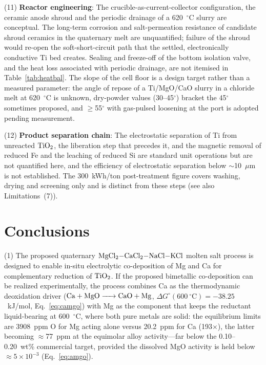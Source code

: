 \documentclass[pdflatex,sn-basic,Numbered]{sn-jnl}
\begin{document}
(11) \textbf{Reactor engineering}: The crucible-as-current-collector configuration, the ceramic anode shroud and the periodic drainage of a 620~$^{\circ}$C slurry are conceptual. The long-term corrosion and salt-permeation resistance of candidate shroud ceramics in the quaternary melt are unquantified; failure of the shroud would re-open the soft-short-circuit path that the settled, electronically conductive Ti bed creates. Sealing and freeze-off of the bottom isolation valve, and the heat loss associated with periodic drainage, are not itemised in Table~\ref{tab:heatbal}. The slope of the cell floor is a design target rather than a measured parameter: the angle of repose of a Ti/MgO/CaO slurry in a chloride melt at 620~$^{\circ}$C is unknown, dry-powder values (30--45$^{\circ}$) bracket the 45$^{\circ}$ sometimes proposed, and $\geq$55$^{\circ}$ with gas-pulsed loosening at the port is adopted pending measurement.

(12) \textbf{Product separation chain}: The electrostatic separation of Ti from unreacted $\ce{TiO2}$, the liberation step that precedes it, and the magnetic removal of reduced Fe and the leaching of reduced Si are standard unit operations but are not quantified here, and the efficiency of electrostatic separation below $\sim$10~$\mu$m is not established. The 300~kWh/ton post-treatment figure covers washing, drying and screening only and is distinct from these steps (see also Limitations~(7)).

\section{Conclusions}\label{sec:conclusions}

(1) The proposed quaternary $\ce{MgCl2-CaCl2-NaCl-KCl}$ molten salt process is designed to enable in-situ electrolytic co-deposition of Mg and Ca for complementary reduction of $\ce{TiO2}$. If the proposed bimetallic co-deposition can be realized experimentally, the process combines Ca as the thermodynamic deoxidation driver ($\ce{Ca + MgO -> CaO + Mg}$, $\Delta G^{\circ}(600~^{\circ}\mathrm{C}) = -38.25$~kJ/mol, Eq.~\ref{eq:camgo}) with Mg as the component that keeps the reductant liquid-bearing at 600~$^{\circ}$C, where both pure metals are solid: the equilibrium limits are 3908~ppm O for Mg acting alone versus 20.2~ppm for Ca (193$\times$), the latter becoming $\approx$77~ppm at the equimolar alloy activity---far below the 0.10--0.20~wt\% commercial target, provided the dissolved MgO activity is held below $\approx 5\times10^{-3}$ (Eq.~\ref{eq:amgo}).
\end{document}
